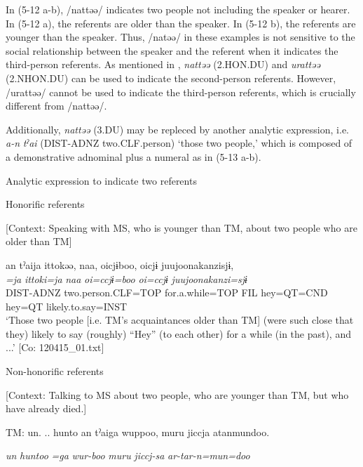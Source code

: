 In (5-12 a-b), /nattəə/ indicates two people not including the speaker or hearer. In (5-12 a), the referents are older than the speaker. In (5-12 b), the referents are younger than the speaker. Thus, /natəə/ in these examples is not sensitive to the social relationship between the speaker and the referent when it indicates the third-person referents. As mentioned in , \textit{nattəə} (2.HON.DU) and \textit{urattəə} (2.NHON.DU) can be used to indicate the second-person referents. However, /urattəə/ cannot be used to indicate the third-person referents, which is crucially different from /nattəə/.

Additionally, \textit{nattəə} (3.DU) may be repleced by another analytic expression, i.e. \textit{a-n} \textit{tˀai} (DIST-ADNZ two.CLF.person) ‘those two people,’ which is composed of a demonstrative adnominal plus a numeral as in (5-13 a-b).

\ea \label{ex:5:13}   Analytic expression to indicate two referents

  \ea Honorific referents

  [Context: Speaking with MS, who is younger than TM, about two people who are older than TM]

\glll  an  tˀaija  ittokəə,  naa,  {\textbar}oi{\textbar}cjɨboo, {\textbar}oi{\textbar}cjɨ  {\textbar}juujoonakanzi{\textbar}sjɨ,\\
\textit{}  \textit{=ja}  \textit{ittoki=ja}  \textit{naa}  \textit{oi=ccjɨ=boo}  \textit{oi=ccjɨ}  \textit{juujoonakanzi=sjɨ}\\
DIST-ADNZ  two.person.CLF=TOP  for.a.while=TOP  FIL  hey=QT=CND  hey=QT  likely.to.say=INST\\
\glt ‘Those two people [i.e. TM’s acquaintances older than TM] (were such close that they) likely to say (roughly) “Hey” (to each other) for a while (in the past), and ...’ [Co: 120415\_01.txt]

  \ex Non-honorific referents

  [Context: Talking to MS about two people, who are younger than TM, but who have already died.]

  TM:  un.  .. hunto  an  tˀaiga  wuppoo,  muru jiccja  atanmundoo.
                                                                                                  
    \textit{un}  \textit{huntoo}  \textit{}  \textit{=ga}  \textit{wur-boo}  \textit{muru} \textit{jiccj-sa}  \textit{ar-tar-n=mun=doo}
                                                                                                  
